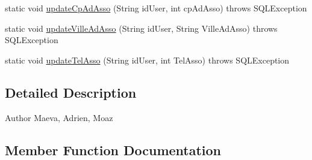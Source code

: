 \begin{DoxyCompactItemize}
\item 
static void \hyperlink{classcom_1_1ecetech_1_1bti4_1_1itproject_1_1classified_1_1dao_1_1_association_d_a_o_a7c9c96fcfb5e950d61f79df851f9575b}{update\+Cp\+Ad\+Asso} (String id\+User, int cp\+Ad\+Asso)  throws S\+Q\+L\+Exception 
\item 
static void \hyperlink{classcom_1_1ecetech_1_1bti4_1_1itproject_1_1classified_1_1dao_1_1_association_d_a_o_a65048bf95fdcd35ee35d5c0bee623b8b}{update\+Ville\+Ad\+Asso} (String id\+User, String Ville\+Ad\+Asso)  throws S\+Q\+L\+Exception 
\item 
static void \hyperlink{classcom_1_1ecetech_1_1bti4_1_1itproject_1_1classified_1_1dao_1_1_association_d_a_o_a4714a27c39d0537a449cc3f47cf9e737}{update\+Tel\+Asso} (String id\+User, int Tel\+Asso)  throws S\+Q\+L\+Exception 
\end{DoxyCompactItemize}


\subsection{Detailed Description}
\begin{DoxyAuthor}{Author}
Maeva, Adrien, Moaz 
\end{DoxyAuthor}


\subsection{Member Function Documentation}
